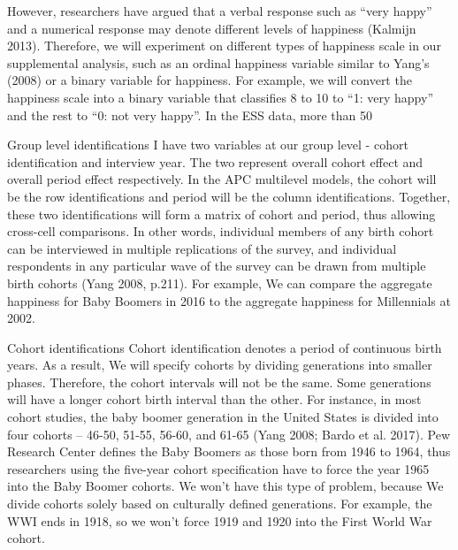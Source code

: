 However, researchers have argued that a verbal response such as “very happy” and a numerical response may denote different levels of happiness (Kalmijn 2013). Therefore, we will experiment on different types of happiness scale in our supplemental analysis, such as an ordinal happiness variable similar to Yang's (2008) or a binary variable for happiness. For example, we will convert the happiness scale into a binary variable that classifies 8 to 10 to “1: very happy” and the rest to “0: not very happy”. In the ESS data, more than 50%

Group level identifications
I have two variables at our group level - cohort identification and interview year. The two represent overall cohort effect and overall period effect respectively. In the APC multilevel models, the cohort will be the row identifications and period will be the column identifications. Together, these two identifications will form a matrix of cohort and period, thus allowing cross-cell comparisons. In other words, individual members of any birth cohort can be interviewed in multiple replications of the survey, and individual respondents in any particular wave of the survey can be drawn from multiple birth cohorts (Yang 2008, p.211). For example, We can compare the aggregate happiness for Baby Boomers in 2016 to the aggregate happiness for Millennials at 2002.

Cohort identifications 
Cohort identification denotes a period of continuous birth years. As a result, We will specify cohorts by dividing generations into smaller phases. Therefore, the cohort intervals will not be the same. Some generations will have a longer cohort birth interval than the other. For instance, in most cohort studies, the baby boomer generation in the United States is divided into four cohorts – 46-50, 51-55, 56-60, and 61-65 (Yang 2008; Bardo et al. 2017). Pew Research Center defines the Baby Boomers as those born from 1946 to 1964, thus researchers using the five-year cohort specification have to force the year 1965 into the Baby Boomer cohorts. We won’t have this type of problem, because We divide cohorts solely based on culturally defined generations. For example, the WWI ends in 1918, so we won’t force 1919 and 1920 into the First World War cohort.

